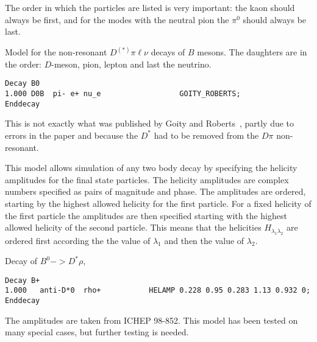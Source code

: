 \Notes
The order in which the particles are listed is very important: the kaon should 
always be first, and for the modes with the neutral pion the $\pi^{0}$ should always be last.




\label{goityroberts}



\Expl
Model for the non-resonant $D^{(*)}\pi\ell\nu$ decays of
$B$ mesons. The daughters are in the order: $D$-meson,
pion, lepton and last the neutrino.

\Example
\begin{verbatim}
Decay B0
1.000 D0B  pi- e+ nu_e                  GOITY_ROBERTS;
Enddecay
\end{verbatim}

\Notes
This is not exactly what was published by Goity and Roberts~\cite{Goity95a}, 
partly
due to errors in the paper and because the $D^*$ had to be 
removed from the $D\pi$ non-resonant.




\label{helamp}



\Expl
This model allows simulation of any two body decay by specifying the 
helicity amplitudes for the final state particles. The helicity amplitudes
are complex numbers specified as pairs of magnitude and phase. The amplitudes
are ordered, starting by the highest allowed helicity for the first particle.
For a fixed helicity of the first particle the amplitudes are then specified
starting with the highest allowed helicity of the second particle. This means
that the helicities $H_{\lambda_1\lambda_2}$ are ordered first according the
the value of $\lambda_1$ and then the value of $\lambda_2$.

\Example
Decay of $B^0->D^*\rho$, 
\begin{verbatim}
Decay B+
1.000   anti-D*0  rho+           HELAMP 0.228 0.95 0.283 1.13 0.932 0;
Enddecay
\end{verbatim}

\Notes
The amplitudes are taken from ICHEP 98-852. This model has been tested on
many special cases, but further testing is needed.



\label{hqet}

